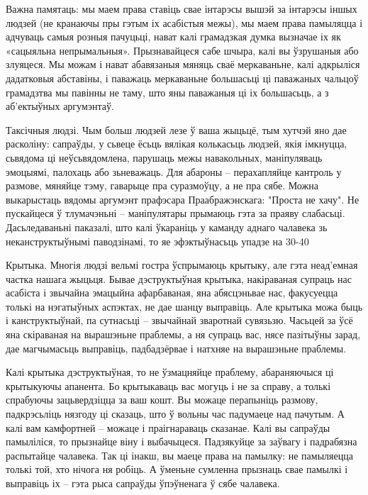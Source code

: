 Важна памятаць: мы маем права ставіць свае інтарэсы вышэй за інтарэсы іншых людзей (не кранаючы пры гэтым іх асабістыя межы), мы маем права памыляцца і адчуваць самыя розныя пачуцьці, нават калі грамадзкая думка вызначае іх як «сацыяльна непрымальныя». Прызнавайцеся сабе шчыра, калі вы ўзрушаныя або злуяцеся. Мы можам і нават абавязаныя мяняць сваё меркаваньне, калі адкрыліся дадатковыя абставіны, і паважаць меркаваньне большасьці ці паважаных чальцоў грамадзтва мы павінны не таму, што яны паважаныя ці іх большасьць, а з аб'ектыўных аргумэнтаў.

Таксічныя людзі. Чым больш людзей лезе ў ваша жыцьцё, тым хутчэй яно дае расколіну: сапраўды, у сьвеце ёсьць вялікая колькасьць людзей, якія імкнуцца, сьвядома ці неўсьвядомлена, парушаць межы навакольных, маніпуляваць эмоцыямі, палохаць або зьневажаць. Для абароны – перахапляйце кантроль у размове, мяняйце тэму, гаварыце пра суразмоўцу, а не пра сябе. Можна выкарыстаць вядомы аргумэнт прафэсара Праабражэнскага: "Проста не хачу". Не пускайцеся ў тлумачэньні – маніпулятары прымаюць гэта за праяву слабасьці. Дасьледаваньні паказалі, што калі ўкараніць у каманду аднаго чалавека зь неканструктыўнымі паводзінамі, то яе эфэктыўнасьць упадзе на 30-40%

Крытыка. Многія людзі вельмі гостра ўспрымаюць крытыку, але гэта неад'емная частка нашага жыцьця. Бывае дэструктыўная крытыка, накіраваная супраць нас асабіста і звычайна эмацыйна афарбаваная, яна абясцэньвае нас, факусуецца толькі на нэгатыўных аспэктах, не дае шанцу выправіць. Але крытыка можа быць і канструктыўнай, па сутнасьці – звычайнай зваротнай сувязьзю. Часьцей за ўсё яна скіраваная на вырашэньне праблемы, а ня супраць вас, нясе пазітыўны зарад, дае магчымасьць выправіць, падбадзёрвае і натхняе на вырашэньне праблемы.

Калі крытыка дэструктыўная, то не ўзмацняйце праблему, абараняючыся ці крытыкуючы апанента. Бо крытыкаваць вас могуць і не за справу, а толькі спрабуючы зацьвердзіцца за ваш кошт. Вы можаце перапыніць размову, падкрэсьліць нязгоду ці сказаць, што ў вольны час падумаеце над пачутым. А калі вам камфортней – можаце і праігнараваць сказанае. Калі вы сапраўды памыліліся, то прызнайце віну і выбачыцеся. Падзякуйце за заўвагу і падрабязна распытайце чалавека. Так ці інакш, вы маеце права на памылку: не памыляецца толькі той, хто нічога ня робіць. А ўменьне сумленна прызнаць свае памылкі і выправіць іх – гэта рыса сапраўды ўпэўненага ў сябе чалавека.

